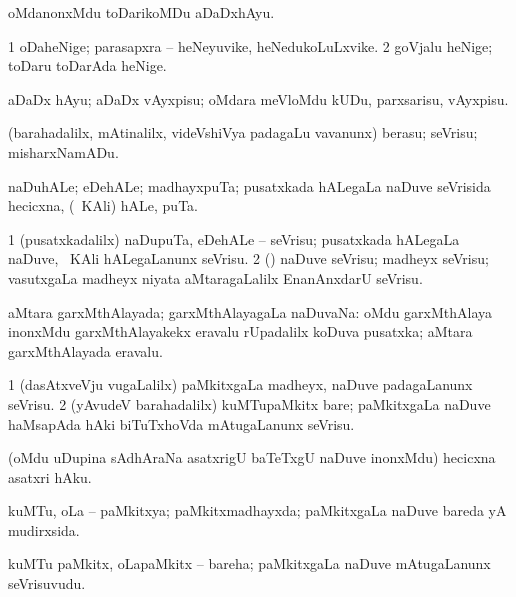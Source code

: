 \noindent 
\gl{\akirx}
\bmng
oMdanonxMdu toDarikoMDu aDaDxhAyu. 
\emng
\eentry

\bentry
{}
\gl{\nA}
\bmng
\bnum
\num{1} oDaheNige; parasapxra -- heNeyuvike, heNedukoLuLxvike. 
\num{2} goVjalu heNige; toDaru toDarAda heNige. 
\enum
\emng
\eentry

\bentry
{}
\gl{\akirx}
\bmng
 aDaDx hAyu; aDaDx vAyxpisu; oMdara meVloMdu kUDu, parxsarisu, vAyxpisu. 
\emng
\eentry

\bentry
{}
\gl{\sakirx}
\bmng
(barahadalilx, mAtinalilx, videVshiVya padagaLu \mo vavanunx) berasu; seVrisu; misharxNamADu. 
\emng
\eentry

\bentry
{}
\gl{\nA}
\bmng
naDuhALe; eDehALe; madhayxpuTa; pusatxkada hALegaLa naDuve seVrisida hecicxna, (\sA\ KAli) hALe, puTa. 
\emng
\eentry

\bentry
{}
\gl{\sakirx}
\bmng
\bnum
\num{1} (pusatxkadalilx) naDupuTa, eDehALe -- seVrisu; pusatxkada hALegaLa naDuve, \sA\ KAli hALegaLanunx seVrisu. 
\num{2} (\rUpa) naDuve seVrisu; madheyx seVrisu; vasutxgaLa madheyx niyata aMtaragaLalilx EnanAnxdarU seVrisu. 
\enum
\emng
\eentry

\bentry
{}
\gl{\gu}
\bmng
aMtara garxMthAlayada; garxMthAlayagaLa naDuvaNa:  oMdu garxMthAlaya inonxMdu garxMthAlayakekx eravalu rUpadalilx koDuva pusatxka; aMtara garxMthAlayada eravalu. 
\emng
\eentry

\bentry
{}
\gl{\sakirx}
\bmng
\bnum
\num{1} (dasAtxveVju \mo vugaLalilx) paMkitxgaLa madheyx, naDuve padagaLanunx seVrisu. 
\num{2} (yAvudeV barahadalilx) kuMTupaMkitx bare; paMkitxgaLa naDuve haMsapAda hAki biTuTxhoVda mAtugaLanunx seVrisu. 
\enum
\emng
\eentry

\bentry
{}
\gl{\sakirx}
\bmng
(oMdu uDupina sAdhAraNa asatxrigU baTeTxgU naDuve inonxMdu) hecicxna asatxri hAku. 
\emng
\eentry

\bentry
{}
\gl{\gu}
\bmng
kuMTu, oLa -- paMkitxya; paMkitxmadhayxda; paMkitxgaLa naDuve bareda yA mudirxsida. 
\emng
\eentry

\bentry
{}
\gl{\nA}
\bmng
kuMTu paMkitx, oLapaMkitx -- bareha; paMkitxgaLa naDuve mAtugaLanunx seVrisuvudu. 
\emng
\eentry

